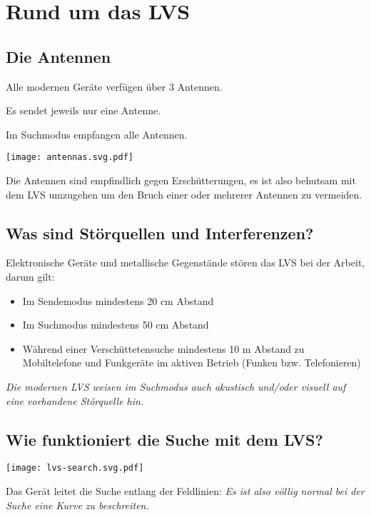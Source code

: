 \section{Rund um das LVS}

\subsection{Die Antennen}

Alle modernen Geräte verfügen über 3 Antennen.

Es sendet jeweils nur eine Antenne.

Im Suchmodus empfangen alle Antennen.

\begin{center}
  \texttt{[image: antennas.svg.pdf]}
\end{center}

Die Antennen sind empfindlich gegen Erschütterungen, es ist also behutsam mit dem LVS umzugehen um den Bruch einer oder mehrerer Antennen zu vermeiden.

\newcolumn

\subsection{Was sind Störquellen und Interferenzen?}

Elektronische Geräte und metallische Gegenstände stören das LVS bei der Arbeit, darum gilt:

\begin{itemize}
  \item{Im Sendemodus mindestens 20 cm Abstand}
  \item{Im Suchmodus mindestens 50 cm Abstand}
  \item{Während einer Verschüttetensuche mindestens 10 m Abstand zu Mobiltelefone und Funkgeräte im aktiven Betrieb (Funken bzw. Telefonieren)}
\end{itemize}

\textit{Die modernen LVS weisen im Suchmodus auch akustisch und/oder visuell auf eine vorhandene Störquelle hin.}

\subsection{Wie funktioniert die Suche mit dem LVS?}

\texttt{[image: lvs-search.svg.pdf]}

Das Gerät leitet die Suche entlang der Feldlinien: \textit{Es ist also völlig normal bei der Suche eine Kurve zu beschreiten.}


